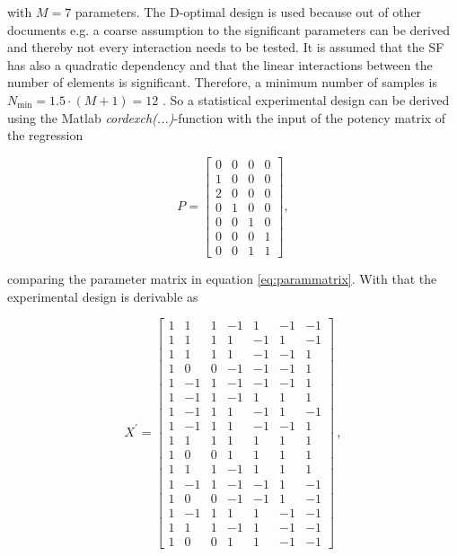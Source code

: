 with $M=7$ parameters. The D-optimal design is used because out of other documents e.g. \cite{2018arXiv180310993F} a coarse assumption to the significant parameters can be derived and thereby not every interaction needs to be tested. It is assumed that the \ac{SF} has also a quadratic dependency and that the linear interactions between the number of elements is significant. Therefore, a minimum number of samples is $N_\text{min}=1.5\cdot\left(M+1\right)=12$ \cite{dffs}. So a statistical experimental design can be derived using the Matlab\texttrademark{} \textit{cordexch(...)}-function with the input of the potency matrix of the regression

\begin{equation}
P = \begin{bmatrix}
0 & 0 & 0 & 0\\
1 & 0 & 0 & 0\\
2 & 0 & 0 & 0\\
0 & 1 & 0 & 0\\
0 & 0 & 1 & 0\\
0 & 0 & 0 & 1\\
0 & 0 & 1 & 1
\end{bmatrix},
\end{equation}

comparing the parameter matrix in equation \ref{eq:parammatrix}. With that the experimental design is derivable as 

\begin{equation}
X^\prime = \begin{bmatrix}
1&1&1&-1&1&-1&-1\\
1&1&1&1&-1&1&-1\\
1&1&1&1&-1&-1&1\\
1&0&0&-1&-1&-1&1\\
1&-1&1&-1&-1&-1&1\\
1&-1&1&-1&1&1&1\\
1&-1&1&1&-1&1&-1\\
1&-1&1&1&-1&-1&1\\
1&1&1&1&1&1&1\\
1&0&0&1&1&1&1\\
1&1&1&-1&1&1&1\\
1&-1&1&-1&-1&1&-1\\
1&0&0&-1&-1&1&-1\\
1&-1&1&1&1&-1&-1\\
1&1&1&-1&1&-1&-1\\
1&0&0&1&1&-1&-1
\end{bmatrix}\,,
\end{equation}

